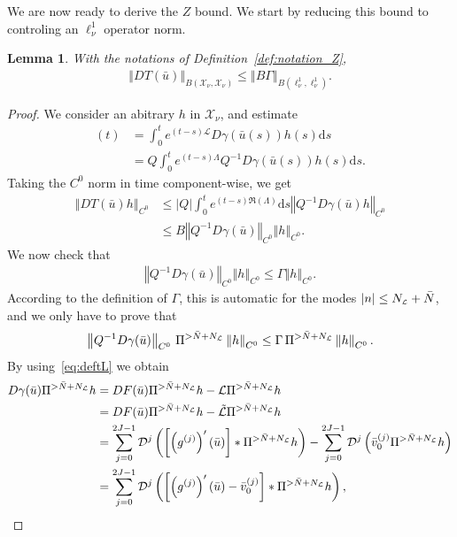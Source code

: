 \documentclass[10pt,a4paper]{article}
\theoremstyle{plain}
\newtheorem{lemma}[theorem]{Lemma}
\renewcommand{\L}{\mathcal{L}}
\newcommand{\tL}{\tilde{\mathcal{L}}}
\newcommand{\D}{\mathcal{D}}
\newcommand{\X}{\mathcal{X}}
\newcommand{\bu}{\bar{u}}
\newcommand{\bv}{\bar{v}}
\newcommand{\bN}{\bar{N}}
\newcommand{\1}{\mathbf{1}}
\renewcommand{\d}{\mathrm{d}}
\newcommand{\NL}{N_{\text{\tiny{$\L$}}}}
\begin{document}
We are now ready to derive the $Z$ bound. We start by reducing  this bound to controling an $\ell^1_\nu$ operator norm.
\begin{lemma}
\label{lem:fromZtoell1}
With the notations of Definition~\ref{def:notation_Z},
\begin{align*}
\left\Vert DT(\bu) \right\Vert_{B(\X_\nu,\X_\nu)} \leq \left\Vert B\Gamma \right\Vert_{B(\ell^1_\nu,\ell^1_\nu)}.
\end{align*}
\end{lemma}
%
\begin{proof}
We consider an abitrary $h$ in $\X_\nu$, and estimate
\begin{align*}
[DT(\bu)h] (t) &= \int_{0}^t e^{(t-s)\L} D\gamma(\bu(s))h(s) \d s \\
&= Q \int_{0}^t e^{(t-s)\Lambda} Q^{-1}D\gamma(\bu(s))h(s) \d s.
\end{align*}
Taking the $C^0$ norm in time component-wise, we get
\begin{align*}
\left\Vert DT(\bu)h \right\Vert_{C^0} &\leq \vert Q\vert  \int_{0}^t e^{(t-s)\Re(\Lambda)} \d s \left\Vert Q^{-1}D\gamma(\bu)h\right\Vert_{C^0} \\
&\leq B  \left\Vert Q^{-1}D\gamma(\bu)\right\Vert_{C^0}\left\Vert h\right\Vert_{C^0}.
\end{align*}
We now check that
\begin{align*}
\left\Vert Q^{-1}D\gamma(\bu)\right\Vert_{C^0}\left\Vert h\right\Vert_{C^0} \leq \Gamma \left\Vert h\right\Vert_{C^0}.
\end{align*}
According to the definition of $\Gamma$, this is automatic for the modes $\vert n\vert \leq \NL + \bN$, and we only have to prove that
\begin{align*}
\left\Vert Q^{-1}D\gamma(\bu)\right\Vert_{C^0}\, \Pi^{> \bN + \NL} \left\Vert h\right\Vert_{C^0} \leq \Gamma \, \Pi^{> \bN + \NL} \left\Vert h\right\Vert_{C^0}.
\end{align*}
By using~\eqref{eq:deftL} we obtain
\begin{align*}
D\gamma(\bu) \Pi^{> \bN + \NL}h  &= DF(\bu)\Pi^{> \bN + \NL} h - \L \Pi^{> \bN + \NL} h \\
 &= DF(\bu)\Pi^{> \bN + \NL}h - \tL \Pi^{> \bN + \NL}h \\
&= \sum_{j=0}^{2J-1} \D^j \left(\left[\left(g^{(j)}\right)'(\bu)\right]\ast \Pi^{> \bN + \NL} h \right) -  \sum_{j=0}^{2J-1}  \D^j \left(\bv^{(j)}_0\Pi^{> \bN + \NL} h\right)  \\
 &=  \sum_{j=0}^{2J-1} \D^j \left(\left[\left(g^{(j)}\right)'(\bu) - \bar{v}^{(j)}_0 \right]\ast \Pi^{> \bN + \NL} h \right),

\end{align*}
\end{proof}
\end{document}
